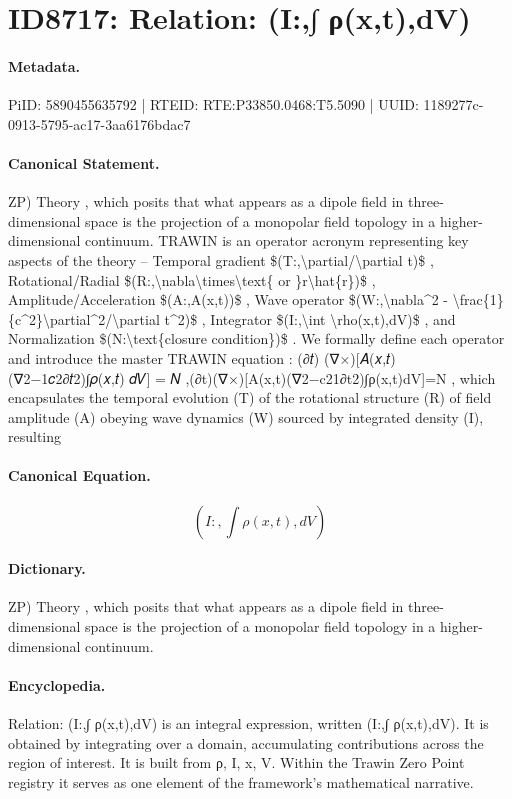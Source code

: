 \section*{ID8717: Relation: (I:,∫ ρ(x,t),dV)}
\paragraph{Metadata.}
PiID: 5890455635792 | RTEID: RTE:P33850.0468:T5.5090 | UUID: 1189277c-0913-5795-ac17-3aa6176bdac7

\paragraph{Canonical Statement.}
ZP) Theory , which posits that what appears as a dipole field in three-dimensional space is the projection of a monopolar field topology in a higher-dimensional continuum. TRAWIN is an operator acronym representing key aspects of the theory – Temporal gradient \$(T:,\textbackslash{}partial/\textbackslash{}partial t)\$ , Rotational/Radial \$(R:,\textbackslash{}nabla\textbackslash{}times\textbackslash{}text\{ or \}r\textbackslash{}hat\{r\})\$ , Amplitude/Acceleration \$(A:,A(x,t))\$ , Wave operator \$(W:,\textbackslash{}nabla\textasciicircum{}2 - \textbackslash{}frac\{1\}\{c\textasciicircum{}2\}\textbackslash{}partial\textasciicircum{}2/\textbackslash{}partial t\textasciicircum{}2)\$ , Integrator \$(I:,\textbackslash{}int \textbackslash{}rho(x,t),dV)\$ , and Normalization \$(N:\textbackslash{}text\{closure condition\})\$ . We formally define each operator and introduce the master TRAWIN equation : (∂𝑡) (∇×)[𝐴(𝑥,𝑡) (∇2−1𝑐2∂𝑡2)∫𝜌(𝑥,𝑡) 𝑑𝑉] = 𝑁 ,(∂t​)(∇×)[A(x,t)(∇2−c21​∂t2​)∫ρ(x,t)dV]=N , which encapsulates the temporal evolution (T) of the rotational structure (R) of field amplitude (A) obeying wave dynamics (W) sourced by integrated density (I), resulting

\paragraph{Canonical Equation.}
\[
(I:,\int \rho(x,t),dV)
\]

\paragraph{Dictionary.}
ZP) Theory , which posits that what appears as a dipole field in three-dimensional space is the projection of a monopolar field topology in a higher-dimensional continuum.

\paragraph{Encyclopedia.}
Relation: (I:,∫ ρ(x,t),dV) is an integral expression, written (I:,∫ ρ(x,t),dV). It is obtained by integrating over a domain, accumulating contributions across the region of interest. It is built from ρ, I, x, V. Within the Trawin Zero Point registry it serves as one element of the framework's mathematical narrative.
